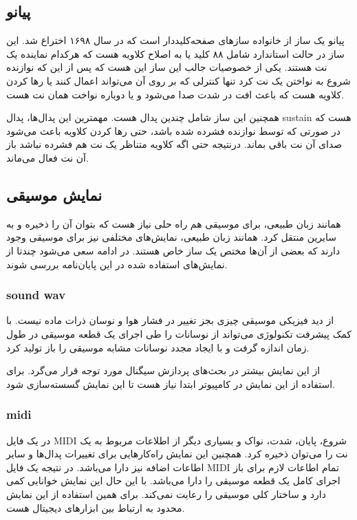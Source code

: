 \subsection{پیانو}
پیانو یک ساز از خانواده ساز‌های صفحه‌کلیددار است که در سال ۱۶۹۸ اختراع شد. این
ساز در حالت استاندارد شامل ۸۸ کلید یا به اصلاح کلاویه هست که هرکدام نماینده یک
نت هستند. یکی از خصوصیات جالب این ساز این هست که پس از این که نوازنده شروع به
نواختن یک نت کرد تنها کنترلی که بر روی آن می‌تواند اعمال کنند یا رها کردن کلاویه
هست که باعث افت در شدت صدا می‌شود و یا دوباره نواخت همان نت هست.

همچنین این ساز شامل چندین پدال هست. مهمترین این پدال‌ها، پدال \gls{sustain} هست
که در صورتی که توسط نوازنده فشرده شده باشد، حتی رها کردن کلاویه باعث می‌شود صدای
آن نت باقی بماند. درنتیجه حتی اگه کلاویه متناظر یک نت هم فشرده نباشد باز آن نت
فعال می‌ماند.

\subsection{نمایش موسیقی}
همانند زبان طبیعی، برای موسیقی هم راه حلی نیاز هست که بتوان آن را ذخیره و به
سایرین منتقل کرد. همانند زبان طبیعی، نمایش‌های مختلفی نیز برای موسیقی وجود دارند
که بعضی‌ از آن‌ها مختص یک ساز خاص هستند. در ادامه سعی می‌شود چندتا از نمایش‌های
استفاده شده در این پایان‌نامه بررسی شوند.

\subsubsection{\gls{sound wav}}
از دید فیزیکی موسیقی چیزی بجز تغییر در فشار هوا و نوسان ذرات ماده نیست. با کمک
پیشرفت تکنولوژی می‌تواند از نوسانات را طی اجرای یک قطعه موسیقی در طول زمان
اندازه گرفت و با ایجاد مجدد نوسانات مشابه موسیقی را باز تولید کرد.

از این نمایش بیشتر در بحث‌های پردازش سیگنال مورد توجه قرار می‌گرد. برای استفاده
از این نمایش در کامپیوتر ابتدا نیاز هست تا این نمایش گسسته‌سازی شود.

\subsubsection{\gls{midi}}
در یک فایل \gls{MIDI} شروع، پایان، شدت، نواک و بسیاری دیگر از اطلاعات مربوط به
یک نت را می‌توان ذخیره کرد. همچنین این نمایش راه‌کارهایی برای تغییرات پدال‌ها و
سایر اطاعات اضافه نیز دارا می‌باشد. در نتیجه یک فایل \gls{MIDI} تمام اطاعات لازم
برای باز اجرای کامل یک قطعه موسیقی را دارا می‌باشد. با این حال این نمایش خوانایی
کمی‌ دارد و ساختار کلی موسیقی را رعایت نمی‌کند. برای همین استفاده از این نمایش
محدود به ارتباط بین ابزارهای دیجیتال هست.

